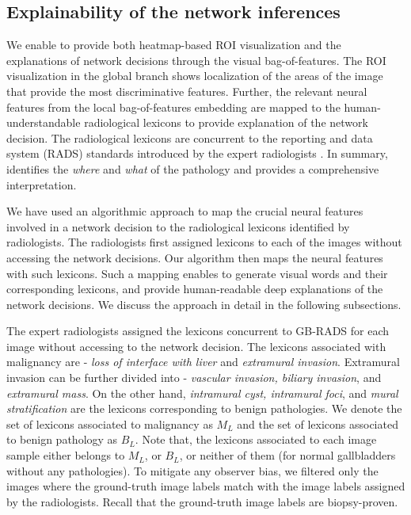 \subsection{Explainability of the network inferences}

We enable \radformer to provide both heatmap-based ROI visualization and the explanations of network decisions through the visual bag-of-features. The ROI visualization in the global branch shows localization of the areas of the image that provide the most discriminative features. Further, the relevant neural features from the local bag-of-features embedding are mapped to the human-understandable radiological lexicons to provide explanation of the network decision. The radiological lexicons are concurrent to the reporting and data system (RADS) standards introduced by the expert radiologists \cite{gb-rads-paper}. In summary, \radformer identifies the \emph{where} and \emph{what} of the pathology and provides a comprehensive interpretation. 
\par We have used an algorithmic approach to map the crucial neural features involved in a network decision to the radiological lexicons identified by radiologists. The radiologists first assigned lexicons to each of the images without accessing the network decisions. Our algorithm then maps the neural features with such lexicons. Such a mapping enables \radformer to generate visual words and their corresponding lexicons, and provide human-readable deep explanations of the network decisions. We discuss the approach in detail in the following subsections.

%
The expert radiologists assigned the lexicons concurrent to GB-RADS for each image without accessing to the network decision. The lexicons associated with malignancy are - \emph{loss of interface with liver} and \emph{extramural invasion}. Extramural invasion can be further divided into - \emph{vascular invasion, biliary invasion}, and \emph{extramural mass}. On the other hand, \emph{intramural cyst, intramural foci}, and \emph{mural stratification} are the lexicons corresponding to benign pathologies. We denote the set of lexicons associated to malignancy as $M_L$ and the set of lexicons associated to benign pathology as $B_L$. Note that, the lexicons associated to each image sample either belongs to $M_L$, or $B_L$, or neither of them (for normal gallbladders without any pathologies). To mitigate any observer bias, we filtered only the images where the ground-truth image labels match with the image labels assigned by the radiologists. Recall that the ground-truth image labels are biopsy-proven. 


